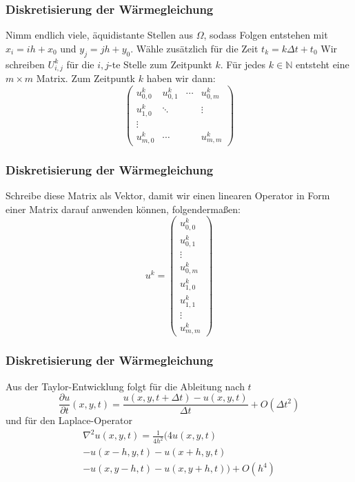 \documentclass[xcolor = dvipsnames, notheorems]{beamer}
\theoremstyle{definition}
\begin{document}
\begin{frame}
\frametitle{Diskretisierung der Wärmegleichung}
	Nimm endlich viele, äquidistante Stellen aus $\Omega$, sodass Folgen entstehen mit $x_i = ih + x_0$ und $y_j = jh + y_0$. Wähle zusätzlich für die Zeit $t_k = k\Delta t + t_0$ Wir schreiben $U_{i,j}^k$ für die $i,j$-te Stelle zum Zeitpunkt $k$. Für jedes $k \in \mathbb{N}$ entsteht eine $m \times m$ Matrix. Zum Zeitpuntk $k$ haben wir dann:
	$$
	\begin{pmatrix}
		u^k_{0,0}& 		u^k_{0,1}& \cdots & u^k_{0,m} 	\\
		u^k_{1,0}&		\ddots&			&\vdots	\\
		\vdots & & &	\\
		u^k_{m,0}&	\cdots	&			 & u^k_{m,m}
	\end{pmatrix}
	$$
\end{frame}
\begin{frame}
\frametitle{Diskretisierung der Wärmegleichung}
	Schreibe diese Matrix als Vektor, damit wir einen linearen Operator in Form einer Matrix darauf anwenden können, folgendermaßen:
	$$ u^k =
	\begin{pmatrix}
		u^k_{0,0} \\
		u^k_{0,1} \\
		\vdots \\
		u^k_{0,m} \\
		u^k_{1,0} \\
		u^k_{1,1} \\
		\vdots \\
		u^k_{m,m}
	\end{pmatrix}
	$$
\end{frame}
\begin{frame}
\frametitle{Diskretisierung der Wärmegleichung}
	Aus der Taylor-Entwicklung folgt für die Ableitung nach $t$
	$$\frac{\partial u}{\partial t}(x,y,t) = \frac{u(x,y,t+\Delta t) - u(x,y,t)}{\Delta t} + O(\Delta t^2)$$
	und für den Laplace-Operator
	\begin{multline*}
		\nabla^2u(x,y,t) = \frac{1}{4h^2} \bigg(4u(x,y,t) \\- u(x-h,y,t) - u(x+h,y,t) \\- u(x,y-h,t) - u(x,y+h,t) \bigg) + O(h^4)
	\end{multline*}
\end{frame}
\end{document}
